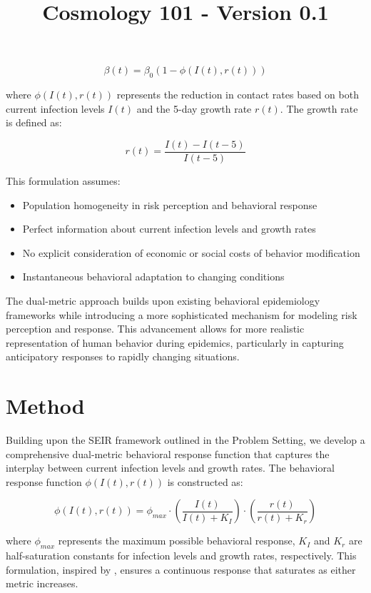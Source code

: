 \documentclass{article}\usepackage{graphicx} \usepackage{amsmath} \usepackage{colortbl}\title{Cosmology 101 - Version 0.1}
\begin{document}
\begin{equation}
\beta(t) = \beta_0(1 - \phi(I(t), r(t)))
\end{equation}

where $\phi(I(t), r(t))$ represents the reduction in contact rates based on both current infection levels $I(t)$ and the 5-day growth rate $r(t)$. The growth rate is defined as:

\begin{equation}
r(t) = \frac{I(t) - I(t-5)}{I(t-5)}
\end{equation}

This formulation assumes:
\begin{itemize}
\item Population homogeneity in risk perception and behavioral response
\item Perfect information about current infection levels and growth rates
\item No explicit consideration of economic or social costs of behavior modification
\item Instantaneous behavioral adaptation to changing conditions
\end{itemize}

The dual-metric approach builds upon existing behavioral epidemiology frameworks while introducing a more sophisticated mechanism for modeling risk perception and response. This advancement allows for more realistic representation of human behavior during epidemics, particularly in capturing anticipatory responses to rapidly changing situations.\section{Method}
Building upon the SEIR framework outlined in the Problem Setting, we develop a comprehensive dual-metric behavioral response function that captures the interplay between current infection levels and growth rates. The behavioral response function $\phi(I(t), r(t))$ is constructed as:

\begin{equation}
\phi(I(t), r(t)) = \phi_{max} \cdot \left(\frac{I(t)}{I(t) + K_I}\right) \cdot \left(\frac{r(t)}{r(t) + K_r}\right)
\end{equation}

where $\phi_{max}$ represents the maximum possible behavioral response, $K_I$ and $K_r$ are half-saturation constants for infection levels and growth rates, respectively. This formulation, inspired by \cite{funk2010modelling}, ensures a continuous response that saturates as either metric increases.
\end{document}
